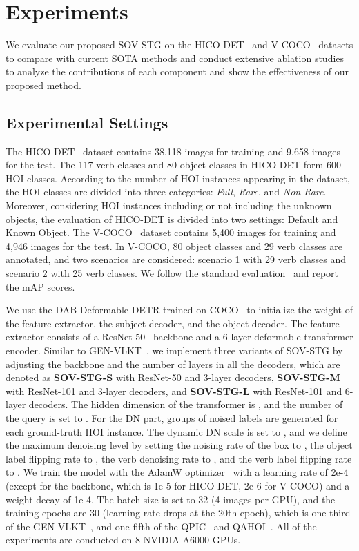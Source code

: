 \documentclass[10pt,twocolumn,letterpaper]{article}
\begin{document}
\section{Experiments}

We evaluate our proposed SOV-STG on the HICO-DET~\cite{chao2018learning} and V-COCO~\cite{gupta2015visual} datasets to compare with current SOTA methods and conduct extensive ablation studies to analyze the contributions of each component and show the effectiveness of our proposed method.

\subsection{Experimental Settings}

\quad The HICO-DET~\cite{chao2018learning} dataset contains 38,118 images for training and 9,658 images for the test.
The 117 verb classes and 80 object classes in HICO-DET form 600 HOI classes.
According to the number of HOI instances appearing in the dataset, the HOI classes are divided into three categories: \textit{Full}, \textit{Rare}, and \textit{Non-Rare}.
Moreover, considering HOI instances including or not including the unknown objects, the evaluation of HICO-DET is divided into two settings: Default and Known Object.
The V-COCO~\cite{gupta2015visual} dataset contains 5,400 images for training and 4,946 images for the test.
In V-COCO, 80 object classes and 29 verb classes are annotated, and two scenarios are considered: scenario 1 with 29 verb classes and scenario 2 with 25 verb classes.
We follow the standard evaluation~\cite{chao2018learning} and report the mAP scores.

\quad We use the DAB-Deformable-DETR trained on COCO~\cite{lin2014microsoft} to initialize the weight of the feature extractor, the subject decoder, and the object decoder.
The feature extractor consists of a ResNet-50~\cite{he2016deep} backbone and a 6-layer deformable transformer encoder.
Similar to GEN-VLKT~\cite{liao2022gen}, we implement three variants of SOV-STG by adjusting the backbone and the number of layers in all the decoders, which are denoted as \textbf{SOV-STG-S} with ResNet-50 and 3-layer decoders, \textbf{SOV-STG-M} with ResNet-101 and 3-layer decoders, and \textbf{SOV-STG-L} with ResNet-101 and 6-layer decoders.
The hidden dimension of the transformer is , and the number of the query is set to .
For the DN part,  groups of noised labels are generated for each ground-truth HOI instance.
The dynamic DN scale is set to , and we define the maximum denoising level by setting the noising rate of the box to , the object label flipping rate to , the verb denoising rate to , and the verb label flipping rate to .
We train the model with the AdamW optimizer~\cite{loshchilov2018decoupled} with a learning rate of 2e-4 (except for the backbone, which is 1e-5 for HICO-DET, 2e-6 for V-COCO) and a weight decay of 1e-4.
The batch size is set to 32 (4 images per GPU), and the training epochs are 30 (learning rate drops at the 20th epoch), which is one-third of the GEN-VLKT~\cite{liao2022gen}, and one-fifth of the QPIC~\cite{tamura2021qpic} and QAHOI~\cite{cjw_qahoi}.
All of the experiments are conducted on 8 NVIDIA A6000 GPUs.
\end{document}
